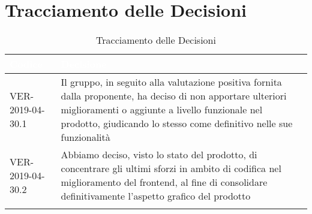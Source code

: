 
\section{Tracciamento delle Decisioni}

\begin{longtable}{|C{.40\textwidth}|C{.60\textwidth}|}
\hline
{}\textbf{\textcolor{white}{Codice}} & \textbf{\textcolor{white}{Decisione}}\\
\hline \hline
VER-2019-04-30.1 & Il gruppo, in seguito alla valutazione positiva fornita dalla proponente, ha deciso di non apportare ulteriori miglioramenti o aggiunte a livello funzionale nel prodotto, giudicando lo stesso come definitivo nelle sue funzionalità\\
\hline
{}VER-2019-04-30.2 & Abbiamo deciso, visto lo stato del prodotto, di concentrare gli ultimi sforzi in ambito di codifica nel miglioramento del frontend, al fine di consolidare definitivamente l'aspetto grafico del prodotto\\
\hline
\caption{Tracciamento delle Decisioni}
\end{longtable}

